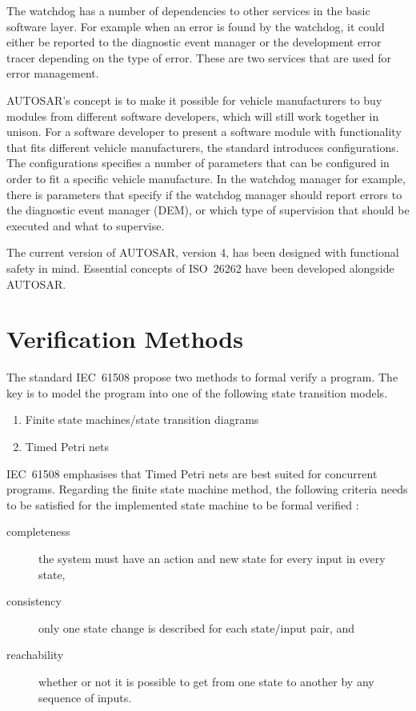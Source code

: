 The watchdog has a number of dependencies to other services in the
basic software layer. For example when an error is found by the
watchdog, it could either be reported to the diagnostic event manager
or the development error tracer depending on the type of error. These
are two services that are used for error management. \cite{SPEC:AUTOSAR:WDGM}

AUTOSAR's concept is to make it possible for vehicle manufacturers to
buy modules from different software developers, which will still work
together in unison. For a software developer to present a software
module with functionality that fits different vehicle manufacturers,
the standard introduces configurations. The configurations specifies a
number of parameters that can be configured in order to fit a specific
vehicle manufacture. In the watchdog manager for example, there is
parameters that specify if the watchdog manager should report errors
to the diagnostic event manager (DEM), or which type of supervision
that should be executed and what to supervise. \cite{AUTOSAR:basic_info}\cite{AUTOSAR:LayeredSoftwareArchitecture}

The current version of AUTOSAR, version 4, has been designed with
functional safety in mind. Essential concepts of ISO~26262 have been
developed alongside AUTOSAR. \cite{AUTOSAR:basic_info}

\section{Verification Methods}
The standard IEC~61508 propose two methods to formal verify a
program. The key is to model the program into one of the following
state transition models. \cite[p.127]{IEC61508}

\begin{enumerate}
\item \label{enum:FSM} Finite state machines/state transition diagrams
\item Timed Petri nets
\end{enumerate}

IEC~61508 emphasises that Timed Petri nets are best suited for
concurrent programs. Regarding the finite state machine method, the
following criteria needs to be satisfied for the implemented state
machine to be formal verified \cite[p.77-79]{IEC61508}\cite[p.322]{COURSEBOOK:safety-critical}:

\begin{description}
  \item[completeness] the system must have an action and new state for
    every input in every state,
  \item[consistency] only one state change is described for each
    state/input pair, and
  \item[reachability] whether or not it is possible to get from one
    state to another by any sequence of inputs.
\end{description}

